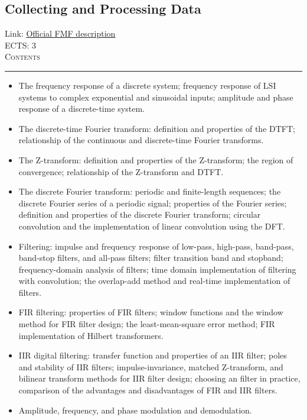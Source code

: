 \documentclass[11pt, a4paper]{article}
\newenvironment{course}[3]{
\subsection{#1}%
Link: \href{#2}{Official FMF description}\\%
ECTS: #3%
\vspace{1ex}
\\
{\large \textsc{Contents}}\\[-0.9ex]%
\rule{\textwidth}{0.5pt}
\vspace{-3ex}
}
{}
\newenvironment{chapter}[1]{
\begin{tcolorbox}[title=#1, breakable]
}
{\end{tcolorbox}}
\begin{document}
\begin{course}{Collecting and Processing Data}{https://www.fmf.uni-lj.si/en/study-physics/programmes/1fiz/2020/7000777/courses/1178/}{3}
\begin{chapter}{Digital signal processing}
\begin{itemize}
            \item The frequency response of a discrete system; frequency response of LSI systems to complex exponential and sinusoidal inputs; amplitude and phase response of a discrete-time system.

            \item The discrete-time Fourier transform: definition and properties of the DTFT; relationship of the continuous and discrete-time Fourier transforms.
            
            \item The Z-transform: definition and properties of the Z-transform; the region of convergence; relationship of the Z-transform and DTFT.

            \item The discrete Fourier transform: periodic and finite-length sequences; the discrete Fourier series of a periodic signal; properties of the Fourier series; definition and properties of the discrete Fourier transform; circular convolution and the implementation of linear convolution using the DFT.

            \item Filtering: impulse and frequency response of low-pass, high-pass, band-pass, band-stop filters, and all-pass filters; filter transition band and stopband; frequency-domain analysis of filters; time domain implementation of filtering with convolution;
            the overlap-add method and real-time implementation of filters.
            
            \item FIR filtering: properties of FIR filters; window functions and the window method for FIR filter design; the least-mean-square error method; FIR implementation of Hilbert transformers.

            \item IIR digital filtering: transfer function and properties of an IIR filter; poles and stability of IIR filters; impulse-invariance, matched Z-transform, and bilinear transform methods for IIR filter design;
            choosing an filter in practice, comparison of the advantages and disadvantages of FIR and IIR filters.

            \item Amplitude, frequency, and phase modulation and demodulation.
        
        \end{itemize}
    \end{chapter}
\end{course}
\end{document}
